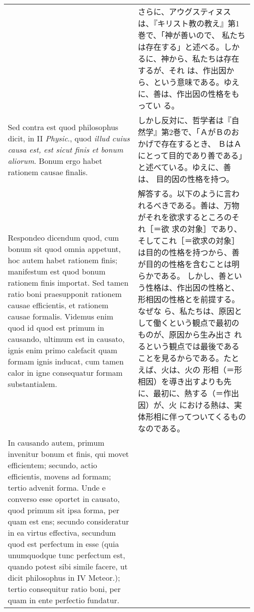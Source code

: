 \documentclass[10pt]{jsarticle}
\begin{document}
\begin{longtable}{p{21em}p{21em}}
&


さらに、アウグスティヌスは、『キリスト教の教え』第1巻で、「神が善いので、
 私たちは存在する」と述べる。しかるに、神から、私たちは存在するが、それ
 は、作出因から、という意味である。ゆえに、善は、作出因の性格をもってい
 る。

\\


Sed contra est quod philosophus dicit, in II {\itshape Physic}., quod
 {\itshape illud cuius causa est, est sicut finis et bonum
 aliorum}. Bonum ergo habet rationem causae finalis.

&


しかし反対に、哲学者は『自然学』第2巻で、「ＡがＢのおかげで存在するとき、
 ＢはＡにとって目的であり善である」と述べている。ゆえに、善は、
 目的因の性格を持つ。

\\


Respondeo dicendum quod, cum bonum sit quod omnia appetunt, hoc autem
 habet rationem finis; manifestum est quod bonum rationem finis
 importat. 
Sed tamen ratio boni praesupponit rationem causae efficientis, et
 rationem causae formalis. Videmus enim quod id quod est primum in
 causando, ultimum est in causato, ignis enim primo calefacit quam
 formam ignis inducat, cum tamen calor in igne consequatur formam
 substantialem. 

&


解答する。以下のように言われるべきである。善は、万物がそれを欲求するところのそれ［＝欲
 求の対象］であり、そしてこれ［＝欲求の対象］は目的の性格を持つから、善
 が目的の性格を含むことは明らかである。
しかし、善という性格は、作出因の性格と、形相因の性格とを前提する。なぜな
 ら、私たちは、原因として働くという観点で最初のものが、原因から生み出さ
 れるという観点では最後であることを見るからである。たとえば、火は、火の
 形相（＝形相因）を導き出すよりも先に、最初に、熱する（＝作出因）が、火
 における熱は、実体形相に伴ってついてくるものなのである。


\\


In causando autem, primum invenitur bonum et finis, qui movet
 efficientem; secundo, actio efficientis, movens ad formam; tertio
 advenit forma. 
Unde e converso esse oportet in causato, quod primum sit ipsa forma, per
 quam est ens; secundo consideratur in ea virtus effectiva, secundum
 quod est perfectum in esse (quia unumquodque tunc perfectum est, quando
 potest sibi simile facere, ut dicit philosophus in IV Meteor.); tertio
 consequitur ratio boni, per quam in ente perfectio fundatur.


\end{longtable}
\end{document}
